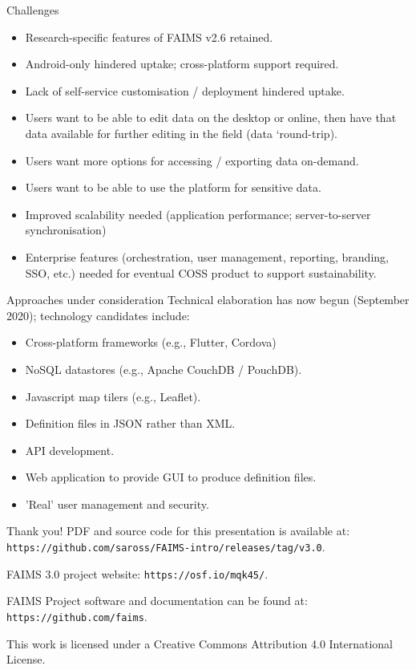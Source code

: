\documentclass[aspectratio=169, 12pt]{beamer} %
\begin{document}
\begin{frame}{Challenges}
    \begin{itemize}[label=\textbullet]
        \item Research-specific features of FAIMS v2.6 retained.
        \item Android-only hindered uptake; cross-platform support required.
        \item Lack of self-service customisation / deployment hindered uptake.
        \item Users want to be able to edit data on the desktop or online, then have that data available for further editing in the field (data `round-trip).
        \item Users want more options for accessing / exporting data on-demand.
        \item Users want to be able to use the platform for sensitive data. 
        \item Improved scalability needed (application performance; server-to-server synchronisation)
        \item Enterprise features (orchestration, user management, reporting, branding, SSO, etc.) needed for eventual COSS product to support sustainability.
    \end{itemize}
\end{frame}

\begin{frame}{Approaches under consideration}
Technical elaboration has now begun (September 2020); technology candidates include:
    \begin{itemize}[label=\textbullet]
        \item Cross-platform frameworks (e.g., Flutter, Cordova)
        \item NoSQL datastores (e.g., Apache CouchDB / PouchDB).
        \item Javascript map tilers (e.g., Leaflet).
        \item Definition files in JSON rather than XML.
        \item API development. 
        \item Web application to provide GUI to produce definition files.
        \item 'Real' user management and security.
    \end{itemize}
\end{frame}

\begin{frame}{Thank you!}
PDF and source code for this presentation is available at: 
\texttt{https://github.com/saross/FAIMS-intro/releases/tag/v3.0}.

FAIMS 3.0 project website: \texttt{https://osf.io/mqk45/}.

FAIMS Project software and documentation can be found at:
\texttt{https://github.com/faims}.


This work is licensed under a Creative Commons Attribution 4.0 International License.

\end{frame}
\end{document}
